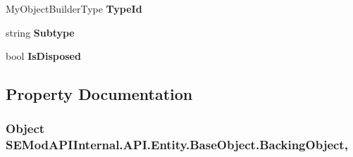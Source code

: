 \begin{DoxyCompactItemize}
\item 
\hypertarget{class_s_e_mod_a_p_i_internal_1_1_a_p_i_1_1_entity_1_1_base_object_ae006a4bff4145ac6e82eeaeaa7d7819d}{}My\+Object\+Builder\+Type {\bfseries Type\+Id}\label{class_s_e_mod_a_p_i_internal_1_1_a_p_i_1_1_entity_1_1_base_object_ae006a4bff4145ac6e82eeaeaa7d7819d}

\item 
\hypertarget{class_s_e_mod_a_p_i_internal_1_1_a_p_i_1_1_entity_1_1_base_object_aa27c64be459c139c9f3d527bb6a6b1a8}{}string {\bfseries Subtype}\label{class_s_e_mod_a_p_i_internal_1_1_a_p_i_1_1_entity_1_1_base_object_aa27c64be459c139c9f3d527bb6a6b1a8}

\item 
\hypertarget{class_s_e_mod_a_p_i_internal_1_1_a_p_i_1_1_entity_1_1_base_object_a5cb1bdc49367746ce14f8194db8d14f6}{}bool {\bfseries Is\+Disposed}\label{class_s_e_mod_a_p_i_internal_1_1_a_p_i_1_1_entity_1_1_base_object_a5cb1bdc49367746ce14f8194db8d14f6}

\end{DoxyCompactItemize}


\subsection{Property Documentation}
\hypertarget{class_s_e_mod_a_p_i_internal_1_1_a_p_i_1_1_entity_1_1_base_object_ae5eb188e3868ea4b3cbb1e64f738a20f}{}
\subsubsection[{Backing\+Object}]{\setlength{\rightskip}{0pt plus 5cm}Object S\+E\+Mod\+A\+P\+I\+Internal.\+A\+P\+I.\+Entity.\+Base\+Object.\+Backing\+Object\hspace{0.3cm}{\ttfamily [get]}, {\ttfamily [set]}}\label{class_s_e_mod_a_p_i_internal_1_1_a_p_i_1_1_entity_1_1_base_object_ae5eb188e3868ea4b3cbb1e64f738a20f}


